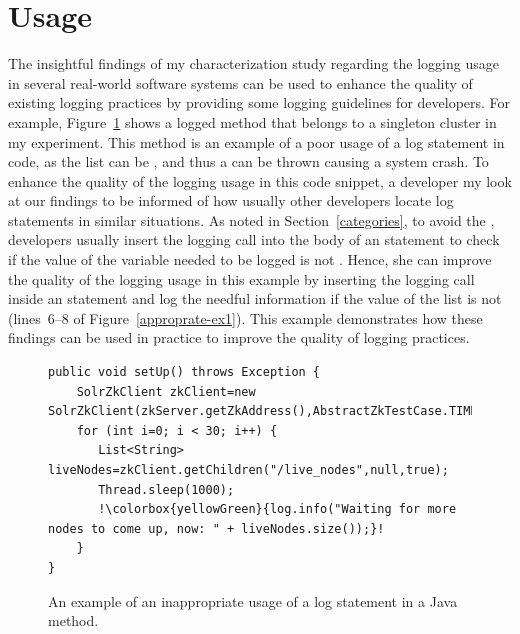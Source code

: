 \section{Usage}  \label{usageELUS}
The insightful findings of my characterization study regarding the logging usage in several real-world software systems can be used to enhance the quality of existing logging practices by providing some logging guidelines for developers. For example, Figure~\ref{inapproprate-ex1} shows a logged method that belongs to a singleton cluster in my experiment. This  method is an example of a poor usage of a log statement in code, as the list  can be , and thus a  can be thrown causing a system crash. To enhance the quality of the logging usage in this code snippet, a developer my look at our findings to be informed of how usually other developers locate log statements in similar situations. As noted in Section~\ref{categories}, to avoid the , developers usually insert the logging call into the body of an  statement to check if the value of the variable needed to be logged is not . Hence, she can improve the quality of the logging usage in this example by inserting the logging call inside an  statement and log the needful information if the value of the list  is not  (lines~6--8 of Figure~\ref{approprate-ex1}). This example demonstrates how these findings can be used in practice to improve the quality of logging practices.


\begin{figure}[p]
\def\baselinestretch{1}
\begin{lstlisting}[escapechar=!]
public void setUp() throws Exception {
    SolrZkClient zkClient=new SolrZkClient(zkServer.getZkAddress(),AbstractZkTestCase.TIMEOUT);
    for (int i=0; i < 30; i++) {
       List<String> liveNodes=zkClient.getChildren("/live_nodes",null,true);
       Thread.sleep(1000);
       !\colorbox{yellowGreen}{log.info("Waiting for more nodes to come up, now: " + liveNodes.size());}!
    }
}
\end{lstlisting}
\caption[An example of an inappropriate usage of a log statement in a Java method.]{An example of an inappropriate usage of a log statement in a Java method.\label{inapproprate-ex1}}
\end{figure}



